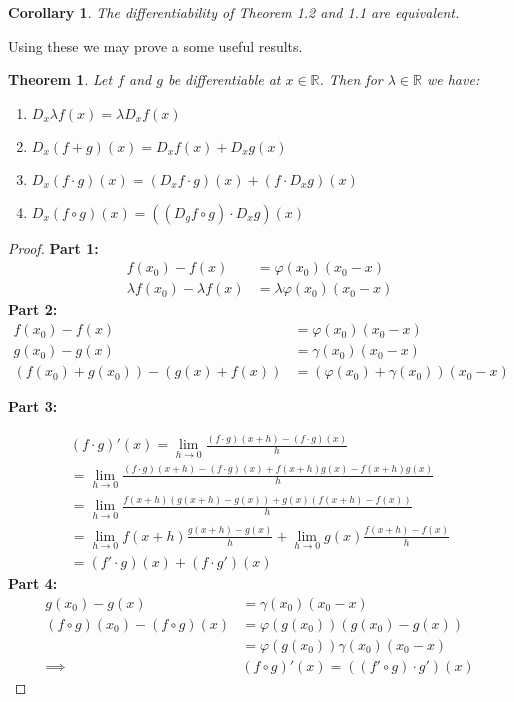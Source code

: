 \documentclass{article}
\newtheorem{theorem}{Theorem}[section]
\newtheorem{corollary}{Corollary}[theorem]
\begin{document}
\begin{corollary}
The differentiability of Theorem 1.2 and 1.1 are equivalent. 
\end{corollary}

Using these we may prove a some useful results.

\begin{theorem}
Let $f$ and $g$ be differentiable at $x \in \mathbb{R}$. Then for $\lambda \in \mathbb{R}$ we have:
\begin{enumerate}
	\item $D_x \lambda f(x)= \lambda D_x f(x)$
    \item $D_x(f+g)(x) = D_x f(x)+D_x g(x)$
    \item $D_x (f\cdot g)(x) = (D_x f \cdot g)(x)+(f \cdot D_x g)(x)$
    \item $D_x(f\circ g)(x) = ((D_g f \circ g)\cdot D_x g)(x)$
\end{enumerate}
\end{theorem}
\begin{proof}
\textbf{Part 1:} 
\begin{align}
	f(x_0)-f(x) &= \varphi(x_0)(x_0-x) \\
	\lambda f(x_0)-\lambda f(x) &= \lambda \varphi(x_0)(x_0-x) \nonumber
\end{align}
\textbf{Part 2:}
\begin{align}
	f(x_0)-f(x) &= \varphi(x_0)(x_0-x) \\
	g(x_0)-g(x) &= \gamma(x_0)(x_0-x) \nonumber \\
	(f(x_0)+g(x_0))-(g(x)+f(x))&= (\varphi(x_0)+\gamma(x_0))(x_0-x) \nonumber
\end{align}

\textbf{Part 3:}

\begin{align}
    (f\cdot g)'(x) = \lim_{h \rightarrow 0} \frac{(f\cdot g)(x+h)-(f
    \cdot g)(x)}{h} \\ \nonumber = \lim_{h \rightarrow 0} \frac{(f\cdot
    g)(x+h)-(f \cdot g)(x)+f(x+h)g(x)-f(x+h)g(x)}{h} \\ \nonumber =
    \lim_{h \rightarrow 0} \frac{f(x+h)(g(x+h)-g(x))+g(x)(f(x+h)-f(x))}{h}
    \\ \nonumber = \lim_{h \rightarrow 0} f(x+h)\frac{g(x+h)-g(x)}{h}
    + \lim_{h \rightarrow 0} g(x)\frac{f(x+h)-f(x)}{h} \\ \nonumber =
    (f' \cdot g)(x)+(f \cdot g')(x) \nonumber
\end{align}
\textbf{Part 4:}
\begin{align}
    g(x_0)-g(x)&=\gamma(x_0)(x_0-x) \\ 
    (f\circ g)(x_0) - (f\circ g)(x) &=\varphi(g(x_0))(g(x_0)-g(x)) \\ \nonumber
    &= \varphi(g(x_0))\gamma(x_0)(x_0-x) \\ \nonumber
    \implies &(f \circ g)'(x) = ((f' \circ g)\cdot g')(x) \nonumber
\end{align}
\end{proof}
\end{document}
